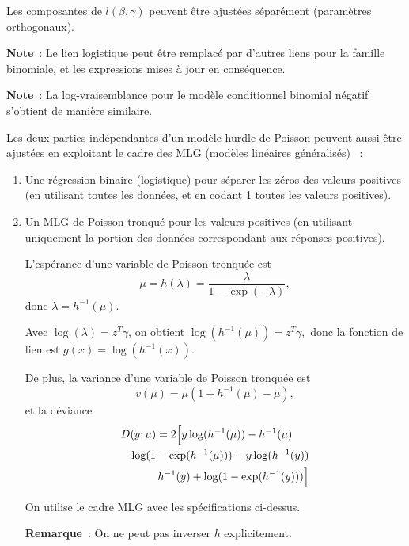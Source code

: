 \documentclass{BeamerTemplate}
\begin{document}
\begin{refsection}
\begin{frame}{}
Les composantes de $l(\beta,\gamma)$ peuvent être ajustées séparément (paramètres orthogonaux).

\bigskip
\bigskip
\textbf{Note}~: Le lien logistique peut être remplacé par d'autres liens pour la famille binomiale, et les expressions mises à jour en conséquence. 

\bigskip
\textbf{Note}~: La log-vraisemblance pour le modèle conditionnel binomial négatif s'obtient de manière similaire. 

\end{frame}

\begin{frame}[allowframebreaks]{}
Les deux parties indépendantes d'un modèle hurdle de Poisson peuvent aussi être ajustées en exploitant le cadre des MLG (modèles linéaires généralisés) \cite{Barr:Wels:2002}~:

\begin{enumerate}
\item Une régression binaire (logistique) pour séparer les zéros des valeurs positives (en utilisant toutes les données, et en codant 1 toutes les valeurs positives). 

\item Un MLG de Poisson tronqué pour les valeurs positives (en utilisant uniquement la portion des données correspondant aux réponses positives).

\bigskip 
L'espérance d'une variable de Poisson tronquée est
$$\mu = h(\lambda) = \frac{\lambda}{1-\exp(-\lambda)},$$
donc $\lambda=h^{-1}(\mu)$.

\bigskip Avec $\log(\lambda) = z^T \gamma $, on obtient $\log(h^{-1}(\mu)) = z^T \gamma,$ 
donc la fonction de lien est $g(x) = \log(h^{-1}(x))$.

De plus, la variance d'une variable de Poisson tronquée est
$$v(\mu) = \mu (1 + h^{-1}(\mu) -\mu),$$
et la déviance
\begin{eqnarray*}
\lefteqn{D(y;\mu) = 2 \Big[ y \log(h^{-1}(\mu)) - h^{-1}(\mu)} \\
 & & \log(1-\exp(h^{-1}(\mu))) - y \log(h^{-1}(y)) \\
 & & h^{-1}(y) + \log(1-\exp(h^{-1}(y))) \Big]
\end{eqnarray*}

\label{truncpoisdef}
On utilise le cadre MLG avec les spécifications ci-dessus.

 \bigskip \textbf{Remarque}~: On ne peut pas inverser $h$ explicitement.
\end{enumerate}


\end{frame}
\end{refsection}
\end{document}
